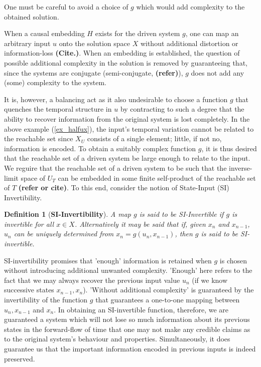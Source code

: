 \documentclass[a4paper,12pt,twoside]{report}
\newtheorem{Definition}{Definition}[]
\begin{document}
One must be careful to avoid a choice of $g$ which would  add complexity to the obtained solution.  

When a causal embedding $H$ exists for the driven system $g$, one can map an arbitrary input ${u}$ onto the solution space $X$ without additional distortion or information-loss \textbf{(Cite.)}.
When an embedding is established, the question of possible additional complexity in the solution is removed by guaranteeing that, since the systems are conjugate (semi-conjugate, \textbf{(refer)}), $g$ does not add any (some) complexity to the system.  

It is, however, a balancing act as it also undesirable to choose a function $g$ that quenches the temporal structure in $u$ by contracting to such a degree that the ability to recover information from the original system is lost completely.
In the above example (\ref{ex_halfux}), the input's temporal variation cannot be related to the reachable set since $X_U$ consists of a single element; little, if not no, information is encoded.
To obtain a suitably complex function $g$, it is thus desired that the reachable set of a driven system  be large enough to relate to the input. 
 We  reguire that the reachable set of a driven system to be such that the inverse-limit space of $U_T$ can be embedded in some finite self-product of the reachable set of $T$ \textbf{(refer or cite)}. To this end, consider the notion of State-Input (SI) Invertibility.  

\begin{Definition}
  [\bf SI-Invertibility]\label{Dfn_SIinv}\rm
  A map $g$ is said to be SI-Invertible if $g$ is invertible for all $x\in{X}$. Alternatively it may be said that if, given $x_n$ and $x_{n-1}$, $u_n$ can be uniquely determined from $x_n=g(u_n,x_{n-1})$, then $g$ is said to be SI-invertible.
\end{Definition}
 
SI-invertibility promises that 'enough' information is retained when $g$ is chosen without introducing additional unwanted complexity.  
'Enough' here refers to the fact that we may always recover the previous input value $u_n$ (if we know successive states $x_{n-1}, x_n$).
'Without additional complexity' is guaranteed by the invertibility of the function $g$ that guarantees a one-to-one mapping between $u_n, x_{n-1}$ and $x_n$. 
In obtaining an SI-invertible function, therefore, we are guaranteed a system which will not lose so much information about its previous states in the forward-flow of time that one may not make any credible claims as to the original system's behaviour and properties. 
Simultaneously, it does guarantee us that the important information encoded in previous inputs is indeed preserved.
\end{document}
